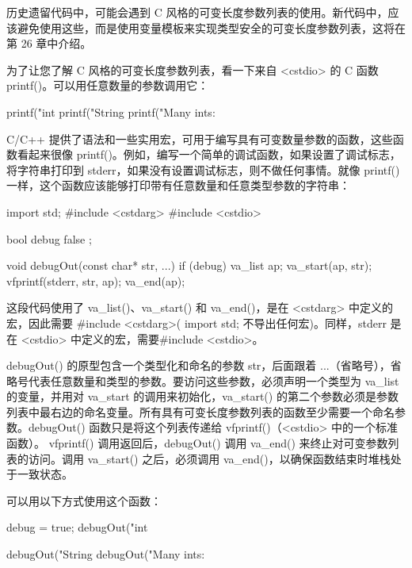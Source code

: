 

历史遗留代码中，可能会遇到 C 风格的可变长度参数列表的使用。新代码中，应该避免使用这些，而是使用变量模板来实现类型安全的可变长度参数列表，这将在第 26 章中介绍。

为了让您了解 C 风格的可变长度参数列表，看一下来自 <cstdio> 的 C 函数 printf()。可以用任意数量的参数调用它：

\begin{cpp}
printf("int %
printf("String %
printf("Many ints: %
\end{cpp}

C/C++ 提供了语法和一些实用宏，可用于编写具有可变数量参数的函数，这些函数看起来很像 printf()。例如，编写一个简单的调试函数，如果设置了调试标志，将字符串打印到 stderr，如果没有设置调试标志，则不做任何事情。就像 printf() 一样，这个函数应该能够打印带有任意数量和任意类型参数的字符串：

\begin{cpp}
import std;
#include <cstdarg>
#include <cstdio>

bool debug { false };

void debugOut(const char* str, ...)
{
    if (debug) {
        va_list ap;
        va_start(ap, str);
        vfprintf(stderr, str, ap);
        va_end(ap);
    }
}
\end{cpp}

这段代码使用了 va\_list()、va\_start() 和 va\_end()，是在 <cstdarg> 中定义的宏，因此需要 \#include <cstdarg>( import std; 不导出任何宏)。同样，stderr 是在 <cstdio> 中定义的宏，需要\#include <cstdio>。

debugOut() 的原型包含一个类型化和命名的参数 str，后面跟着 ...（省略号），省略号代表任意数量和类型的参数。要访问这些参数，必须声明一个类型为 va\_list 的变量，并用对 va\_start 的调用来初始化，va\_start() 的第二个参数必须是参数列表中最右边的命名变量。所有具有可变长度参数列表的函数至少需要一个命名参数。debugOut() 函数只是将这个列表传递给 vfprintf()（<cstdio> 中的一个标准函数）。 vfprintf() 调用返回后，debugOut() 调用 va\_end() 来终止对可变参数列表的访问。调用 va\_start() 之后，必须调用 va\_end()，以确保函数结束时堆栈处于一致状态。

可以用以下方式使用这个函数：

\begin{cpp}
debug = true;
debugOut("int %

debugOut("String %
debugOut("Many ints: %
\end{cpp}

